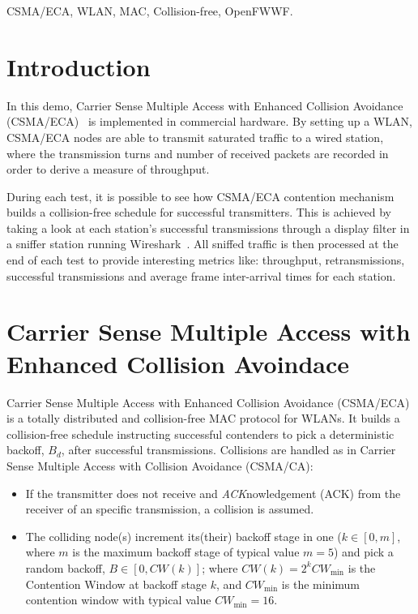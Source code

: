 \documentclass[conference]{IEEEtran}
\begin{document}
\begin{IEEEkeywords}
CSMA/ECA, WLAN, MAC, Collision-free, OpenFWWF.
\end{IEEEkeywords}

\maketitle

\section{Introduction}\label{intro}
In this demo, Carrier Sense Multiple Access with Enhanced Collision Avoidance (CSMA/ECA)~\cite{barcelo2008lba} is implemented in commercial hardware. By setting up a WLAN, CSMA/ECA nodes are able to transmit saturated traffic to a wired station, where the transmission turns and number of received packets are recorded in order to derive a measure of throughput.

During each test, it is possible to see how CSMA/ECA contention mechanism builds a collision-free schedule for successful transmitters. This is achieved by taking a look at each station's successful transmissions through a display filter in a sniffer station running Wireshark~\cite{combs2007wireshark}. All sniffed traffic is then processed at the end of each test to provide interesting metrics like: throughput, retransmissions, successful transmissions and average frame inter-arrival times for each station.

\section{Carrier Sense Multiple Access with Enhanced Collision Avoindace}

Carrier Sense Multiple Access with Enhanced Collision Avoidance (CSMA/ECA) is a totally distributed and collision-free MAC protocol for WLANs. It builds a collision-free schedule instructing successful contenders to pick a deterministic backoff, $B_{d}$, after successful transmissions. Collisions are handled as in Carrier Sense Multiple Access with Collision Avoidance (CSMA/CA):
\begin{itemize}
	\item If the transmitter does not receive and \emph{ACK}nowledgement (ACK) from the receiver of an specific transmission, a collision is assumed.
	\item The colliding node(s) increment its(their) backoff stage in one ($k\in[0,m]$, where $m$ is the maximum backoff stage of typical value $m=5$) and pick a random backoff, $B\in[0,CW(k)]$; where $CW(k)=2^{k}CW_{\min}$ is the Contention Window at backoff stage $k$, and $CW_{\min}$ is the minimum contention window with typical value $CW_{\min}=16$.
\end{itemize}
\end{document}
